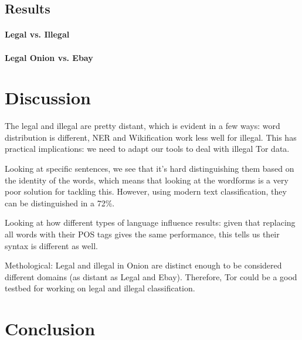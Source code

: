 \documentclass[11pt,a4paper]{article}
\begin{document}
\subsection{Results}

\paragraph{Legal vs. Illegal}

\paragraph{Legal Onion vs. Ebay}


\section{Discussion}

The legal and illegal are pretty distant, which is evident in a few ways: word distribution is different, NER and Wikification work less well
for illegal. This has practical implications: we need to adapt our tools to deal with illegal Tor data. 

Looking at specific sentences, we see that it's hard distinguishing them based on the identity of the words, which means that
looking at the wordforms is a very poor solution for tackling this. However, using modern text classification, they can be distinguished
in a 72\%. 

Looking at how different types of language influence results: given that replacing all words with their POS tags gives
the same performance, this tells us their syntax is different as well.

Methological: Legal and illegal in Onion are distinct enough to be considered different domains (as distant as Legal and Ebay). 
Therefore, Tor could be a good testbed for working on legal and illegal classification.


\section{Conclusion}
 














\end{document}
